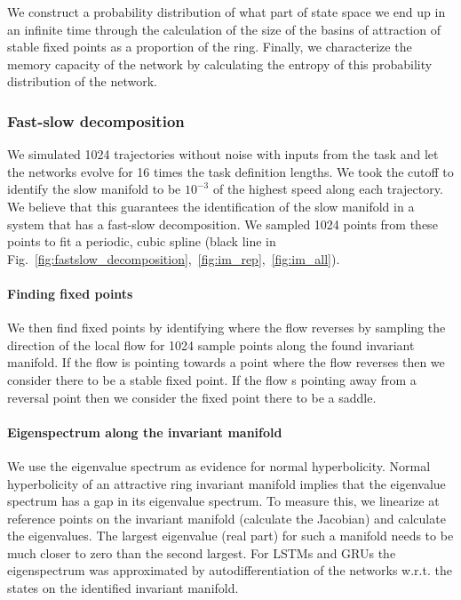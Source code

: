 \documentclass{article} %
\newcounter{ct}
\theoremstyle{definition}
\theoremstyle{remark}
\begin{document}
We construct a probability distribution of what part of state space we end up in an infinite time through the calculation of the size of the basins of attraction of stable fixed points as a proportion of the ring.
Finally, we characterize the memory capacity of the network by calculating the entropy of this probability distribution of the network.


 \subsubsection{Fast-slow decomposition}\label{sec:fsdecmethod}
 We simulated 1024 trajectories without noise with inputs from the task and let the networks evolve for 16 times the task definition lengths.
 We took the cutoff to identify the slow manifold to be \(10^{-3}\) of the highest speed along each trajectory.
 We believe that this guarantees the identification of the slow manifold in a system that has a fast-slow decomposition.
 We sampled 1024 points from these points to fit a periodic, cubic spline (black line in Fig.~\ref{fig:fastslow_decomposition},~\ref{fig:im_rep},~\ref{fig:im_all}).


\paragraph{Finding fixed points}
 We then find fixed points by identifying where the flow reverses by sampling the direction of the local flow for 1024 sample points along the found invariant manifold.
If the flow is pointing towards a point where the flow reverses then we consider there to be a stable fixed point.
If the flow s pointing away from a reversal point then we consider the fixed point there to be a saddle.



\paragraph{Eigenspectrum along the invariant manifold}
We use the eigenvalue spectrum as evidence for normal hyperbolicity.
Normal hyperbolicity of an attractive ring invariant manifold implies that the eigenvalue spectrum has a gap in its eigenvalue spectrum.
To measure this, we linearize at reference points on the invariant manifold (calculate the Jacobian) and calculate the eigenvalues.
The largest  eigenvalue (real part) for such a manifold needs to be much closer to zero than the second largest.
For LSTMs and GRUs the  eigenspectrum was approximated by autodifferentiation of the networks w.r.t. the states on the identified invariant manifold.
\end{document}
